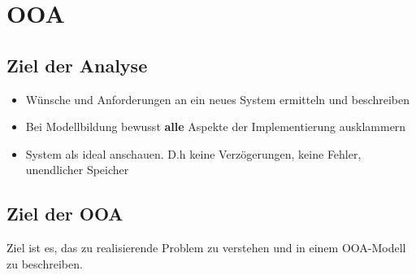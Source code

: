 
\section{OOA }

\subsection{Ziel der Analyse}
  \begin{itemize}[leftmargin = 0.5cm]
    \item Wünsche und Anforderungen an  ein neues System ermitteln und beschreiben
    \item Bei Modellbildung bewusst \textbf{alle} Aspekte der Implementierung ausklammern
    \item System als ideal anschauen. D.h keine Verzögerungen, keine Fehler, unendlicher Speicher
  \end{itemize}
  
\subsection{Ziel der OOA}
  Ziel ist es, das zu realisierende Problem zu verstehen und in einem OOA-Modell zu beschreiben.
  
